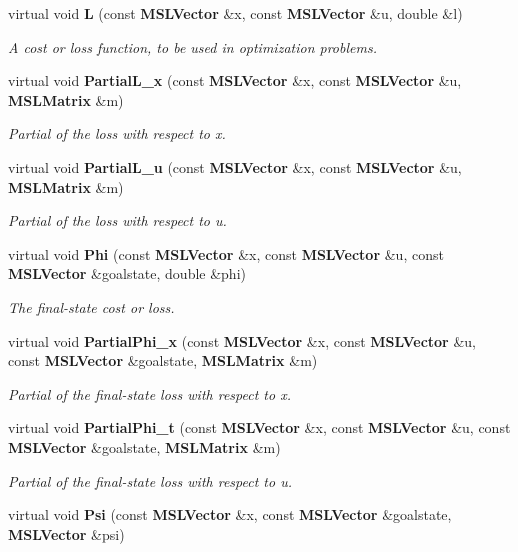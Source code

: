 \begin{CompactItemize}
virtual void {\bf L} (const {\bf MSLVector} \&x, const {\bf MSLVector} \&u, double \&l)
\begin{CompactList}\small\item\em A cost or loss function, to be used in optimization problems.\item\end{CompactList}\item 
virtual void {\bf Partial\-L\_\-x} (const {\bf MSLVector} \&x, const {\bf MSLVector} \&u, {\bf MSLMatrix} \&m)
\begin{CompactList}\small\item\em Partial of the loss with respect to x.\item\end{CompactList}\item 
virtual void {\bf Partial\-L\_\-u} (const {\bf MSLVector} \&x, const {\bf MSLVector} \&u, {\bf MSLMatrix} \&m)
\begin{CompactList}\small\item\em Partial of the loss with respect to u.\item\end{CompactList}\item 
virtual void {\bf Phi} (const {\bf MSLVector} \&x, const {\bf MSLVector} \&u, const {\bf MSLVector} \&goalstate, double \&phi)
\begin{CompactList}\small\item\em The final-state cost or loss.\item\end{CompactList}\item 
virtual void {\bf Partial\-Phi\_\-x} (const {\bf MSLVector} \&x, const {\bf MSLVector} \&u, const {\bf MSLVector} \&goalstate, {\bf MSLMatrix} \&m)
\begin{CompactList}\small\item\em Partial of the final-state loss with respect to x.\item\end{CompactList}\item 
virtual void {\bf Partial\-Phi\_\-t} (const {\bf MSLVector} \&x, const {\bf MSLVector} \&u, const {\bf MSLVector} \&goalstate, {\bf MSLMatrix} \&m)
\begin{CompactList}\small\item\em Partial of the final-state loss with respect to u.\item\end{CompactList}\item 
virtual void {\bf Psi} (const {\bf MSLVector} \&x, const {\bf MSLVector} \&goalstate, {\bf MSLVector} \&psi)

\end{CompactItemize}
